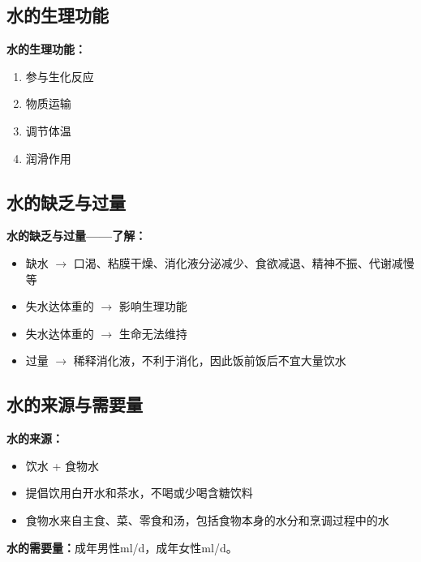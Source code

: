 \subsection{水的生理功能}

\begin{keybox}
\textbf{水的生理功能：}
\begin{enumerate}[leftmargin=*]
    \item 参与生化反应
    \item 物质运输
    \item 调节体温
    \item 润滑作用
\end{enumerate}
\end{keybox}

\subsection{水的缺乏与过量}

\begin{tipbox}
\textbf{水的缺乏与过量——了解：}
\begin{itemize}[leftmargin=*]
    \item 缺水 $\rightarrow$ 口渴、粘膜干燥、消化液分泌减少、食欲减退、精神不振、代谢减慢等
    \item 失水达体重的 $\rightarrow$ 影响生理功能
    \item 失水达体重的 $\rightarrow$ 生命无法维持
    \item 过量 $\rightarrow$ 稀释消化液，不利于消化，因此饭前饭后不宜大量饮水
\end{itemize}
\end{tipbox}

\subsection{水的来源与需要量}

\begin{keybox}
\textbf{水的来源：}
\begin{itemize}[leftmargin=*]
    \item 饮水 + 食物水
    \item 提倡饮用白开水和茶水，不喝或少喝含糖饮料
    \item 食物水来自主食、菜、零食和汤，包括食物本身的水分和烹调过程中的水
\end{itemize}

\textbf{水的需要量：}成年男性ml/d，成年女性ml/d。
\end{keybox}

